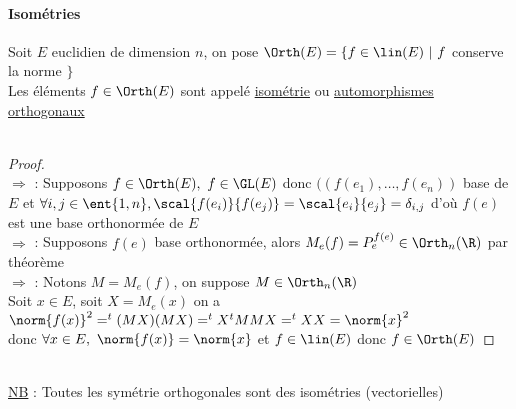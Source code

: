 		\paragraph{Isométries}
			Soit $E$ euclidien de dimension $n$, on pose $\Orth(E) = \{f\in \lin(E) ~|~f$ conserve la norme $\}$\\
			Les éléments $f\in\Orth(E)$ sont appelé \uline{isométrie} ou \uline{automorphismes orthogonaux} \trait
		\vspace*{0.5cm} \\ 
		\vspace*{0.5cm} \\ 
		\begin{proof}
		${}$ \\ \un $\Rightarrow$ \deux : Supposons $f\in\Orth(E) ,~f\in \GL(E)$ donc $((f(e_1),\dots ,f(e_n))$ base de $E$ et 
		$\forall i,j \in \ent{1,n} , \\ \scal{f(e_i)}{f(e_j)} = \scal{e_i}{e_j} = \delta_{i,j}$
		d'où $f(e)$ est une base orthonormée de $E$\\
		\deux $\Rightarrow$ \trois : Supposons $f(e)$ base orthonormée, alors $M_e(f) = P_e^{f(e)} \in \Orth_n(\R)$ par théorème\\
		\trois $\Rightarrow$ \un : Notons $M=M_e(f)$, on suppose $M\in \Orth_n(\R)$\\
		Soit $x\in E$, soit $X=M_e(x)$ on a $\norm{f(x)}^2 = ^t(MX)(MX) = ^tX{^tM}MX = ^tXX = \norm{x}^2$\\
		donc $\forall x\in E,~\norm{f(x)} = \norm{x}$ et $f\in \lin(E)$ donc $f\in \Orth(E)$
		\end{proof}
		${}$ \\ 
		\\ \uline{NB} : Toutes les symétrie orthogonales sont des isométries (vectorielles) \\ \traitd
